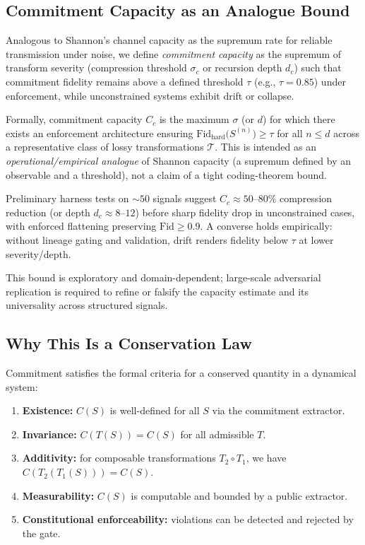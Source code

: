 \documentclass[11pt,a4paper]{article}
\begin{document}
\subsection{Commitment Capacity as an Analogue Bound}

Analogous to Shannon's channel capacity as the supremum rate for reliable transmission under noise, we define \emph{commitment capacity} as the supremum of transform severity (compression threshold $\sigma_c$ or recursion depth $d_c$) such that commitment fidelity remains above a defined threshold $\tau$ (e.g., $\tau = 0.85$) under enforcement, while unconstrained systems exhibit drift or collapse.

Formally, commitment capacity $C_c$ is the maximum $\sigma$ (or $d$) for which there exists an enforcement architecture ensuring $\mathrm{Fid}_{\mathrm{hard}}\bigl(S^{(n)}\bigr) \geq \tau$ for all $n \leq d$ across a representative class of lossy transformations $\mathcal{T}$. This is intended as an \emph{operational/empirical analogue} of Shannon capacity (a supremum defined by an observable and a threshold), not a claim of a tight coding-theorem bound.

Preliminary harness tests on $\sim 50$ signals suggest $C_c \approx 50$--$80\%$ compression reduction (or depth $d_c \approx 8$--$12$) before sharp fidelity drop in unconstrained cases, with enforced flattening preserving $\mathrm{Fid} \geq 0.9$. A converse holds empirically: without lineage gating and validation, drift renders fidelity below $\tau$ at lower severity/depth.

This bound is exploratory and domain-dependent; large-scale adversarial replication is required to refine or falsify the capacity estimate and its universality across structured signals.

\subsection{Why This Is a Conservation Law}
\label{sec:conservation-criteria}

Commitment satisfies the formal criteria for a conserved quantity in a dynamical system:
\begin{enumerate}
    \item \textbf{Existence:} $C(S)$ is well-defined for all $S$ via the commitment extractor.
    \item \textbf{Invariance:} $C(T(S)) = C(S)$ for all admissible $T$.
    \item \textbf{Additivity:} for composable transformations $T_2 \circ T_1$, we have $C(T_2(T_1(S))) = C(S)$.
    \item \textbf{Measurability:} $C(S)$ is computable and bounded by a public extractor.
    \item \textbf{Constitutional enforceability:} violations can be detected and rejected by the gate.
\end{enumerate}
\end{document}
